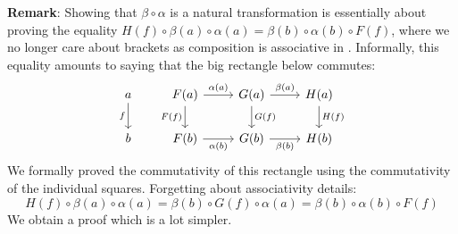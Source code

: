 \noindent
{\bf Remark}: Showing that $\beta\circ\alpha$ is a natural transformation is
essentially about proving the equality $H(f)\circ\beta(a)\circ\alpha(a)=
\beta(b)\circ\alpha(b)\circ F(f)$, where we no longer care about brackets
as composition is associative in \Dat. Informally, this equality amounts
to saying that the big rectangle below commutes:
    \[
        \begin{tikzcd}
            a\arrow[d,swap, "f"]
            &F(a)\arrow[r, "\alpha(a)"]\arrow[d, swap,"F(f)"]
            &G(a)\arrow[r,"\beta(a)"]\arrow[d, "G(f)"]
            &H(a)\arrow[d, "H(f)"]
            \\
            b
            &F(b)\arrow[r, swap, "\alpha(b)"]
            &G(b)\arrow[r, swap, "\beta(b)"]
            &H(b)
        \end{tikzcd}
    \]
We formally proved the commutativity of this rectangle using the
commutativity of the individual squares. Forgetting about associativity details:
    \[
        H(f)\circ\beta(a)\circ\alpha(a)=\beta(b)\circ G(f)\circ\alpha(a)
        =\beta(b)\circ \alpha(b)\circ F(f)
    \]
We obtain a proof which is a lot simpler.

